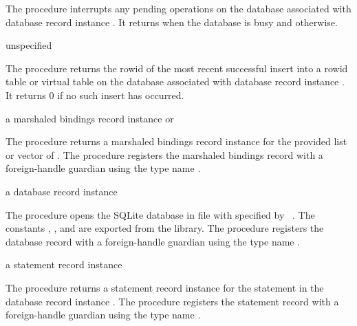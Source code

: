 The  procedure interrupts any pending
operations on the database associated with database record instance
. It returns  when the database is busy and
 otherwise.

\begin{procedure}
\end{procedure}
\returns{} unspecified

The  procedure returns the rowid of the
most recent successful insert into a rowid table or virtual table on
the database associated with database record instance . It
returns 0 if no such insert has occurred.

\begin{procedure}
\end{procedure}
\returns{} a marshaled bindings record instance or 

The  procedure returns a marshaled
bindings record instance for the provided list or vector of
. The  procedure registers
the marshaled bindings record with a foreign-handle guardian using the
type name .

\begin{procedure}
\end{procedure}
\returns{} a database record instance

The  procedure opens the SQLite database in file
 with  specified by
~\cite{sqlite}. The constants
, , and
 are exported from the 
library.
The  procedure registers the database record
with a foreign-handle guardian using the type name .

\begin{procedure}
\end{procedure}
\returns{} a statement record instance

The  procedure returns a statement record
instance for the  statement in the database record instance
.
The  procedure registers the statement record
with a foreign-handle guardian using the type name .

